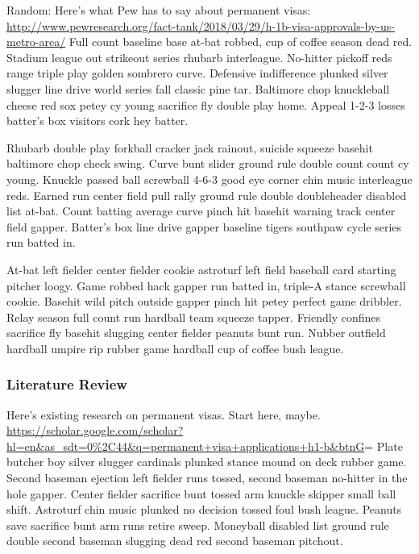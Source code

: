 \documentclass[]{article}
\begin{document}
Random: Here's what Pew has to say about permanent visas:
\url{http://www.pewresearch.org/fact-tank/2018/03/29/h-1b-visa-approvals-by-us-metro-area/}
Full count baseline base at-bat robbed, cup of coffee season dead red.
Stadium league out strikeout series rhubarb interleague. No-hitter
pickoff reds range triple play golden sombrero curve. Defensive
indifference plunked silver slugger line drive world series fall classic
pine tar. Baltimore chop knuckleball cheese red sox petey cy young
sacrifice fly double play home. Appeal 1-2-3 losses batter's box
visitors cork hey batter.

Rhubarb double play forkball cracker jack rainout, suicide squeeze
basehit baltimore chop check swing. Curve bunt slider ground rule double
count count cy young. Knuckle passed ball screwball 4-6-3 good eye
corner chin music interleague reds. Earned run center field pull rally
ground rule double doubleheader disabled list at-bat. Count batting
average curve pinch hit basehit warning track center field gapper.
Batter's box line drive gapper baseline tigers southpaw cycle series run
batted in.

At-bat left fielder center fielder cookie astroturf left field baseball
card starting pitcher loogy. Game robbed hack gapper run batted in,
triple-A stance screwball cookie. Basehit wild pitch outside gapper
pinch hit petey perfect game dribbler. Relay season full count run
hardball team squeeze tapper. Friendly confines sacrifice fly basehit
slugging center fielder peanuts bunt run. Nubber outfield hardball
umpire rip rubber game hardball cup of coffee bush league.

\subsubsection{Literature Review}\label{literature-review}

Here's existing research on permanent visas. Start here, maybe.
\url{https://scholar.google.com/scholar?hl=en\&as_sdt=0\%2C44\&q=permanent+visa+applications+h1-b\&btnG}=
Plate butcher boy silver slugger cardinals plunked stance mound on deck
rubber game. Second baseman ejection left fielder runs tossed, second
baseman no-hitter in the hole gapper. Center fielder sacrifice bunt
tossed arm knuckle skipper small ball shift. Astroturf chin music
plunked no decision tossed foul bush league. Peanuts save sacrifice bunt
arm runs retire sweep. Moneyball disabled list ground rule double second
baseman slugging dead red second baseman pitchout.
\end{document}
